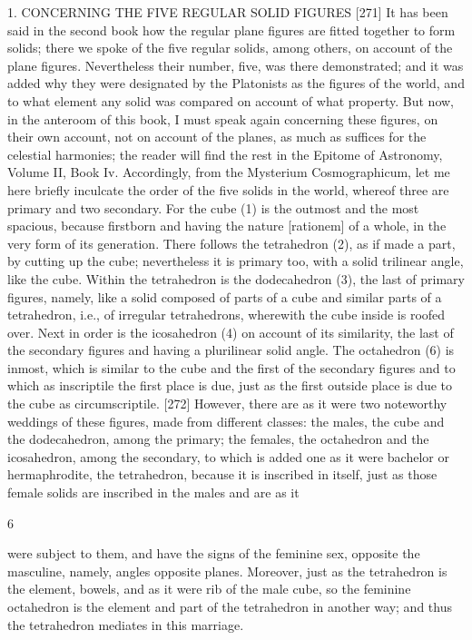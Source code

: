 \documentclass{article}
\begin{document}
1. CONCERNING THE FIVE REGULAR SOLID
FIGURES
[271] It has been said in the second book how the regular plane figures
are fitted together to form solids; there we spoke of the five regular
solids, among others, on account of the plane figures. Nevertheless their
number, five, was there demonstrated; and it was added why they were
designated by the Platonists as the figures of the world, and to what
element any solid was compared on account of what property. But now,
in the anteroom of this book, I must speak again concerning these
figures, on their own account, not on account of the planes, as much as
suffices for the celestial harmonies; the reader will find the rest in
the Epitome of Astronomy, Volume II, Book Iv.
Accordingly, from the Mysterium Cosmographicum, let me here briefly
inculcate the order of the five solids in the world, whereof three are
primary and two secondary. For the cube (1) is the outmost and the most
spacious, because firstborn and having the nature [rationem] of a whole,
in the very form of its generation. There follows the tetrahedron (2), as if
made a part, by cutting up the cube; nevertheless it is primary too, with
a solid trilinear angle, like the cube. Within the tetrahedron is
the dodecahedron (3), the last of primary figures, namely, like a solid
composed of parts of a cube and similar parts of a tetrahedron, i.e., of
irregular tetrahedrons, wherewith the cube inside is roofed over. Next in
order is the icosahedron (4) on account of its similarity, the last of the
secondary figures and having a plurilinear solid angle.
The octahedron (6) is inmost, which is similar to the cube and the first of
the secondary figures and to which as inscriptile the first place is due,
just as the first outside place is due to the cube as circumscriptile.
[272] However, there are as it were two noteworthy weddings of these
figures, made from different classes: the males, the cube and the
dodecahedron, among the primary; the females, the octahedron and the
icosahedron, among the secondary, to which is added one as it were
bachelor or hermaphrodite, the tetrahedron, because it is inscribed in
itself, just as those female solids are inscribed in the males and are as it


6

were subject to them, and have the signs of the feminine sex, opposite
the masculine, namely, angles opposite planes. Moreover, just as the
tetrahedron is the element, bowels, and as it were rib of the male cube,
so the feminine octahedron is the element and part of the tetrahedron in
another way; and thus the tetrahedron mediates in this marriage.
\end{document}
